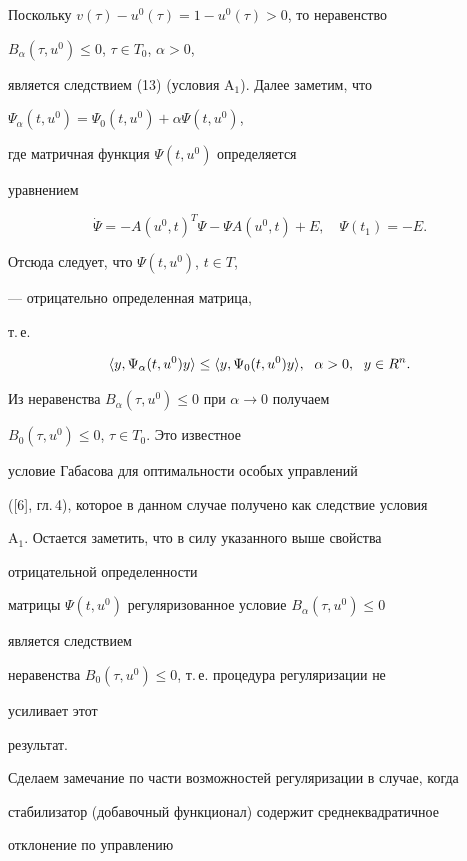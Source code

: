 Поскольку $v(\tau)-u^0(\tau)=1-u^0(\tau)>0$, то неравенство 


$B_\alpha(\tau,u^0)\le 0$, $\tau\in T_0$, $\alpha>0$, 


является следствием (13) (условия A${}_1$). Далее заметим, что 


$\Psi_\alpha(t,u^0)=\Psi_0(t,u^0)+\alpha\Psi(t,u^0)$, 


где матричная функция $\Psi(t,u^0)$ определяется 


уравнением 


$$ 


\Dot\Psi=-A(u^0,t)^T\Psi-\Psi A(u^0,t)+E,\quad \Psi(t_1)=-E. 


$$ 


Отсюда следует, что $\Psi(t,u^0)$, $t\in T$, 


--- отрицательно определенная матрица, 


т.\,е.{} 


$$ 


\la y,\Psi_\alpha(t,u^0)y\ra\le\la y,\Psi_0(t,u^0)y\ra, 


\ \;\alpha>0,\ \;y\in R^n. 


$$ 


Из неравенства $B_\alpha(\tau,u^0)\le 0$ при $\alpha\to 0$ получаем 


$B_0(\tau,u^0)\le 0$, $\tau\in T_0$. Это известное 


условие Габасова для оптимальности особых управлений 


([6], гл.\,4), которое в данном случае получено как следствие условия 


A${}_1$. Остается заметить, что в силу указанного выше свойства 


отрицательной определенности 


матрицы $\Psi(t,u^0)$ регуляризованное условие $B_\alpha(\tau,u^0)\le 0$ 


является следствием 


неравенства $B_0(\tau,u^0)\le 0$, т.\,е.{} процедура регуляризации не 


усиливает этот 


результат. 


 


Сделаем замечание по части возможностей регуляризации в случае, когда 


стабилизатор (добавочный функционал) содержит среднеквадратичное 


отклонение по управлению 


$$ 


